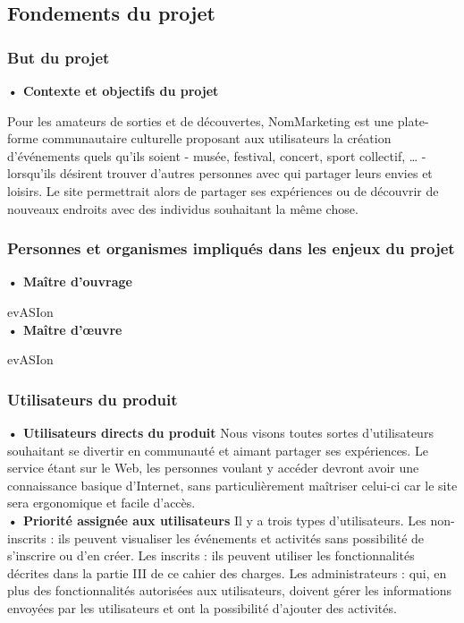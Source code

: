 \subsection{Fondements du projet}

\subsubsection{But du projet}

\textbf{• Contexte et objectifs du projet}

Pour les amateurs de sorties et de découvertes, NomMarketing est une plate-forme communautaire culturelle proposant aux utilisateurs la création d’événements quels qu’ils soient - musée, festival, concert, sport collectif, … - lorsqu’ils désirent trouver d’autres personnes avec qui partager leurs envies et loisirs. Le site permettrait alors de partager ses expériences ou de découvrir de nouveaux endroits avec des individus souhaitant la même chose.

\subsubsection{Personnes et organismes impliqués dans les enjeux du projet}

\textbf{• Maître d’ouvrage}

evASIon \\
    
\textbf{• Maître d’œuvre}

evASIon

\subsubsection{Utilisateurs du produit}

\textbf{• Utilisateurs directs du produit}
Nous visons toutes sortes d’utilisateurs souhaitant se divertir en communauté et aimant partager ses expériences. Le service étant sur le Web, les personnes voulant y accéder devront avoir une connaissance basique d’Internet, sans particulièrement maîtriser celui-ci car le site sera ergonomique et facile d’accès. \\

\textbf{• Priorité assignée aux utilisateurs}
Il y a trois types d’utilisateurs. Les non-inscrits : ils peuvent visualiser les événements et activités sans possibilité de s’inscrire ou d’en créer. Les inscrits : ils peuvent utiliser les fonctionnalités décrites dans la partie III de ce cahier des charges. Les administrateurs : qui, en plus des fonctionnalités autorisées aux utilisateurs, doivent gérer les informations envoyées par les utilisateurs et ont la possibilité d’ajouter des activités. \\

